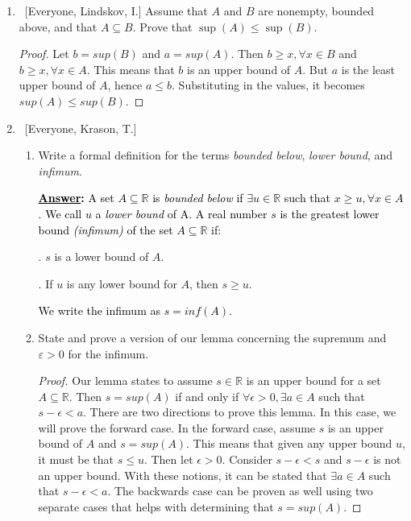\documentclass[10pt]{article}
\begin{document}
\begin{enumerate}
\item  ~[Everyone, Lindskov, I.] Assume that $A$ and $B$ are nonempty, bounded above, and that $A \subseteq B$.  Prove that $\sup{(A)} \leq \sup{(B)}$.
\begin{proof}
Let $b = sup(B)$ and $a = sup(A)$.  Then $b \geq x, \forall x \in B$ and $b \geq x, \forall x \in A$.  This means that $b$ is an upper bound of $A$.  But $a$ is the least upper bound of $A$, hence $a \leq b$.  Substituting in the values, it becomes $sup(A) \leq sup(B)$. 
\end{proof}


\item ~[Everyone, Krason, T.] 

	\begin{enumerate}

	\item  Write a formal definition for the terms \emph{bounded below}, \emph{lower bound}, and \emph{infimum}. 
\par \medskip
	\textbf{\textcolor{black}{\underline{Answer}:}}
\textcolor{black}{A set $A \subseteq \mathbb{R}$ is \emph{bounded below} if $\exists u \in \mathbb{R}$ such that $x \geq u, \forall x \in A$. We call $u$ a \emph{lower bound} of A.  A real number $s$ is the greatest lower bound \emph{(infimum)} of the set $A \subseteq \mathbb{R}$  if: }

\begin{center}
\par {}.	$s$ is a lower bound of $A$. 
\par {}.	If $u$ is any lower bound for $A$, then $s \geq u$. 
\par \medskip
\end{center}
\par \medskip
\textcolor{black}{We write the infimum as $s = inf(A)$.}

	\item  State and prove a version of our lemma concerning the supremum and $\varepsilon > 0$ for the infimum.
\begin{proof}
Our lemma states to assume $s \in \mathbb{R}$ is an upper bound for a set $A \subseteq \mathbb{R}$.  Then $s=sup(A)$ if and only if $\forall \epsilon>0 ,\exists a \in A$ such that $s-\epsilon<a$.  There are two directions to prove this lemma.  In this case, we will prove the forward case.  In the forward case, assume $s$ is an upper bound of $A$ and $s=sup(A)$.  This means that given any upper bound $u$, it must be that $s \leq u$.  Then let $\epsilon >0$.  Consider $s-\epsilon<s$ and $s-\epsilon$ is not an upper bound.  With these notions, it can be stated that $\exists a \in A$ such that $s-\epsilon<a$.  The backwards case can be proven as well using two separate cases that helps with determining that $s=sup(A)$.
\end{proof}
	\end{enumerate}
	

\end{enumerate}
\end{document}
